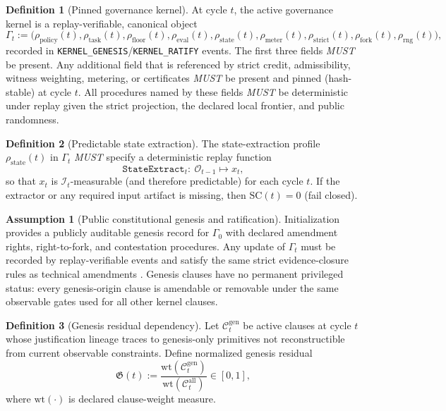 \documentclass[11pt,a4paper]{article}
\newcommand{\cI}{\mathcal{I}}
\newcommand{\cO}{\mathcal{O}}
\theoremstyle{definition}
\newtheorem{definition}{Definition}
\newtheorem{assumption}{Assumption}
\theoremstyle{remark}
\begin{document}
\begin{definition}[Pinned governance kernel]\label{def:pinned_governance_kernel}
At cycle $t$, the active governance kernel is a replay-verifiable, canonical object
\[
\Gamma_t:=\big(\rho_{\mathrm{policy}}(t),\rho_{\mathrm{task}}(t),\rho_{\mathrm{floor}}(t),\rho_{\mathrm{eval}}(t),\rho_{\mathrm{state}}(t),\rho_{\mathrm{meter}}(t),\rho_{\mathrm{strict}}(t),\rho_{\mathrm{fork}}(t),\rho_{\mathrm{rng}}(t)\big),
\]
recorded in \texttt{KERNEL\_GENESIS}/\texttt{KERNEL\_RATIFY} events.
The first three fields \emph{MUST} be present.
Any additional field that is referenced by strict credit, admissibility, witness weighting, metering, or certificates \emph{MUST} be present and pinned (hash-stable) at cycle $t$.
All procedures named by these fields \emph{MUST} be deterministic under replay given the strict projection, the declared local frontier, and public randomness.
\end{definition}

\begin{definition}[Predictable state extraction]\label{def:state_extraction}
The state-extraction profile $\rho_{\mathrm{state}}(t)$ in $\Gamma_t$ \emph{MUST} specify a deterministic replay function
\[
\texttt{StateExtract}_t:\ \cO_{t-1}\mapsto x_t,
\]
so that $x_t$ is $\cI_t$-measurable (and therefore predictable) for each cycle $t$.
If the extractor or any required input artifact is missing, then $\mathrm{SC}(t)=0$ (fail closed).
\end{definition}

\begin{assumption}[Public constitutional genesis and ratification]\label{ass:genesis}
Initialization provides a publicly auditable genesis record for $\Gamma_0$ with declared amendment rights, right-to-fork, and contestation procedures.
Any update of $\Gamma_t$ must be recorded by replay-verifiable events and satisfy the same strict evidence-closure rules as technical amendments \cite{Takahashi2026ConstitutionalSov,Takahashi2026AgendaSov,Takahashi2026Liberty}.
Genesis clauses have no permanent privileged status: every genesis-origin clause is amendable or removable under the same observable gates used for all other kernel clauses.
\end{assumption}

\begin{definition}[Genesis residual dependency]\label{def:genesis_residual_dependency}
Let $\mathcal C_t^{\mathrm{gen}}$ be active clauses at cycle $t$ whose justification lineage traces to genesis-only primitives not reconstructible from current observable constraints.
Define normalized genesis residual
\[
\mathfrak G(t):=\frac{\mathrm{wt}\!\left(\mathcal C_t^{\mathrm{gen}}\right)}
{\mathrm{wt}\!\left(\mathcal C_t^{\mathrm{all}}\right)}\in[0,1],
\]
where $\mathrm{wt}(\cdot)$ is declared clause-weight measure.
\end{definition}
\end{document}
